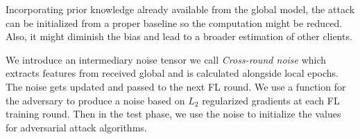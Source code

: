 Incorporating prior knowledge already available from the global model, the attack can be initialized from a proper baseline so the computation might be reduced. Also, it might diminish the bias and lead to a broader estimation of other clients.



We introduce an intermediary noise tensor we call \textit{Cross-round noise} which extracts features from received global and is calculated alongside local epochs. The noise gets updated and passed to the next FL round. 
We use a function for the adversary to produce a noise based on ${L}_{2}$ regularized gradients at each FL training round. Then in the test phase, we use the noise to initialize the values for adversarial attack algorithms. 



